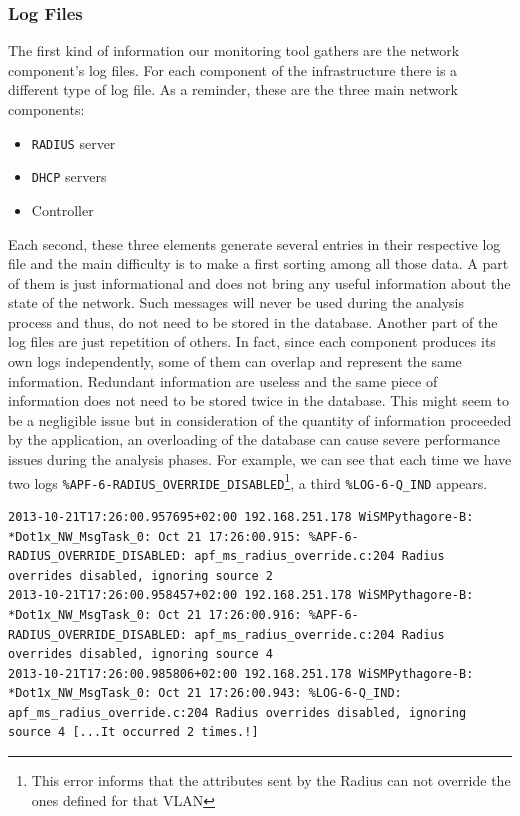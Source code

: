 \subsubsection{Log Files}

The first kind of information our monitoring tool gathers are the network component's log files. For each component of the infrastructure there is a different type of log file. As a reminder, these are the three main network components:

\begin{itemize}
  \item \texttt{RADIUS} server
  \item \texttt{DHCP} servers
  \item Controller
\end{itemize}

Each second, these three elements generate several entries in their respective log file and the main difficulty is to make a first sorting among all those data. A part of them is just informational and does not bring any useful information about the state of the network. Such messages will never be used during the analysis process and thus, do not need to be stored in the database. Another part of the log files are just repetition of others. In fact, since each component produces its own logs independently, some of them can overlap and represent the same information. Redundant information are useless and the same piece of information does not need to be stored twice in the database. This might seem to be a negligible issue but in consideration of the quantity of information proceeded by the application, an overloading of the database can cause severe performance issues during the analysis phases. For example, we can see that each time we have two logs \texttt{\%APF-6-RADIUS\_OVERRIDE\_DISABLED}\footnote{This error informs that the attributes sent by the Radius can not override the ones defined for that VLAN}, a third \texttt{\%LOG-6-Q\_IND} appears.\\

\begin{lstlisting}[frame=single,breaklines=true,caption={Example of useless WiSM logs}]
2013-10-21T17:26:00.957695+02:00 192.168.251.178 WiSMPythagore-B: *Dot1x_NW_MsgTask_0: Oct 21 17:26:00.915: %APF-6-RADIUS_OVERRIDE_DISABLED: apf_ms_radius_override.c:204 Radius overrides disabled, ignoring source 2 
2013-10-21T17:26:00.958457+02:00 192.168.251.178 WiSMPythagore-B: *Dot1x_NW_MsgTask_0: Oct 21 17:26:00.916: %APF-6-RADIUS_OVERRIDE_DISABLED: apf_ms_radius_override.c:204 Radius overrides disabled, ignoring source 4 
2013-10-21T17:26:00.985806+02:00 192.168.251.178 WiSMPythagore-B: *Dot1x_NW_MsgTask_0: Oct 21 17:26:00.943: %LOG-6-Q_IND: apf_ms_radius_override.c:204 Radius overrides disabled, ignoring source 4 [...It occurred 2 times.!]
\end{lstlisting}

